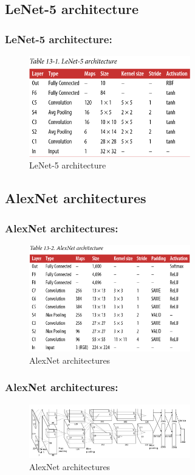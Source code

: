 \documentclass{beamer}
\begin{document}
\subsection{LeNet-5 architecture}
    \begin{frame}
    \frametitle{LeNet-5 architecture: }
            \begin{figure}[H]
            \begin{center}
                \includegraphics[width=7cm]{table13-1}
            \end{center}
        \caption{LeNet-5 architecture}
        \end{figure}
    \end{frame}

\subsection{AlexNet architectures}
    \begin{frame}
    \frametitle{AlexNet architectures: }
        \begin{figure}[H]
            \begin{center}
                \includegraphics[width=7cm]{table13-2}
            \end{center}
        \caption{AlexNet architectures}
        \end{figure}
    \end{frame}

    \begin{frame}
    \frametitle{AlexNet architectures: }
        \begin{figure}[H]
            \begin{center}
                \includegraphics[width=7cm]{FIGURE13-2.png}
            \end{center}
        \caption{AlexNet architectures}
        \end{figure}
    \end{frame}
\end{document}
